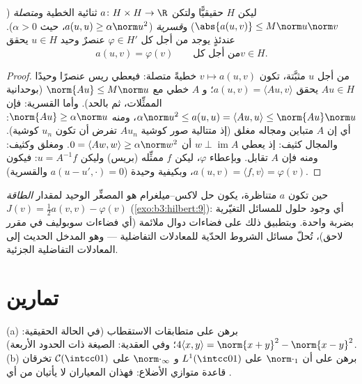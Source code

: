 \begin{theorem}\label{thm:b3:hilbert:laxmilgram}
ليكن $H$  حقيقيًّا ولتكن $a \colon H\times H \to
\R$ ثنائية الخطية
و\emph{متصلة} ($\abs{a(u,v)} \leq M\norm
u\norm v$) و\emph{قسرية} ($a(u, u) \geq \alpha\norm u^2$، حيث
$\alpha > 0$). عندئذٍ يوجد من أجل كل $\varphi \in H'$ عنصرٌ
وحيد $u \in H$ يحقق
\[
a(u, v) = \varphi(v) \qquad \text{من أجل كل} v \in H .
\]
\end{theorem}

\begin{proof}
من أجل $u$ مثبَّتة، تكون $v \mapsto a(u, v)$ خطيةً متصلة: فيعطي ريس عنصرًا
وحيدًا $Au \in H$ يحقق $a(u,v) = \langle Au,
v\rangle$؛ و $A$ خطي مع $\norm{Au} \leq M\norm u$ (بوحدانية
الممثِّلات، ثم بالحد). وأما القسرية: فإن $\alpha\norm u^2 \leq a(u,u) = \langle Au, u\rangle \leq
\norm{Au}\norm u$، ومنه $\norm{Au} \geq \alpha\norm u$:
أي إن $A$ متباين ومجاله مغلق (إذ متتالية صور كوشية $Au_n$ تفرض
أن تكون $u_n$ كوشية). والمجال كثيف: إذ يعطي $w \perp
\operatorname{im}A$ أن $0 = \langle Aw, w\rangle \geq
\alpha\norm w^2$.
ومغلق وكثيف: ومنه فإن $A$ تقابل. وبإعطاء $\varphi$، ليكن $f$
ممثِّله (بريس) وليكن $u = A^{-1}f$: فيكون $a(u, v) = \langle f, v\rangle = \varphi(v)$، وبكيفية
وحيدة ($a(u - u', \cdot) = 0$ والقسرية).
\end{proof}

\begin{remark}\label{rem:b3:hilbert:variational}
حين تكون $a$ متناظرة، يكون حل لاكس--ميلغرام هو المصغِّر الوحيد
لمقدار \emph{الطاقة} $J(v) = \frac12a(v,v) -
\varphi(v)$ (\cref{exo:b3:hilbert:9}): أي وجود حلول للمسائل
التغيّرية بضربة واحدة. وبتطبيق ذلك على فضاءات دوال ملائمة (أي
فضاءات سوبوليف في مقرر لاحق)، تُحلّ مسائل الشروط الحدّية
للمعادلات التفاضلية --- وهو المدخل الحديث إلى المعادلات
التفاضلية الجزئية.
\end{remark}

\section{تمارين}

\begin{exercise}[$\star$]\label{exo:b3:hilbert:1}
(a) برهن على متطابقات الاستقطاب (في الحالة الحقيقية: $4\langle x,
y\rangle = \norm{x+y}^2 - \norm{x-y}^2$؛
وفي العقدية: الصيغة ذات الحدود الأربعة).
(b) برهن على أن $\norm\cdot_1$ على $L^1(\intcc01)$ و $\norm\cdot_\infty$
على $\mathcal C(\intcc01)$ تخرقان قاعدة متوازي الأضلاع: فهذان المعياران لا
يأتيان من أي .
\end{exercise}

